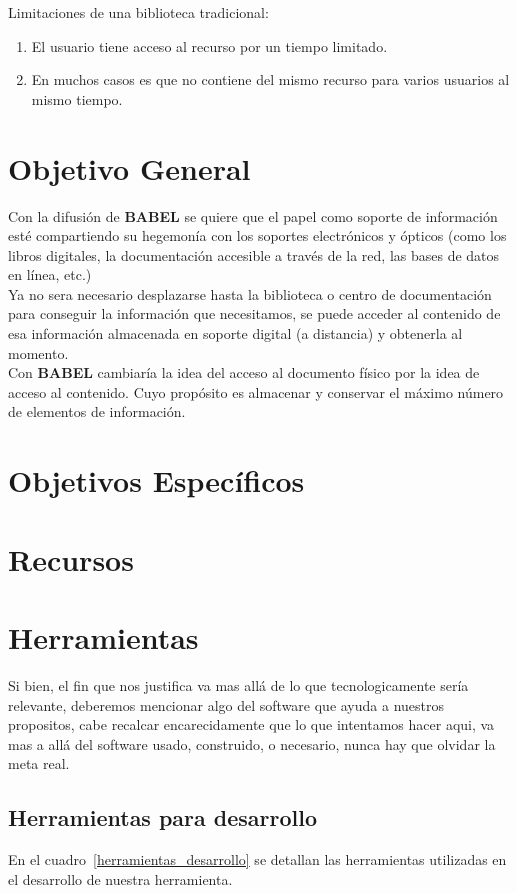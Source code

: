 \documentclass[letter,12pt]{article}
\begin{document}
Limitaciones de una biblioteca tradicional:

\begin{enumerate}
\item El usuario tiene acceso al recurso por un tiempo limitado.
\item En muchos casos es que no contiene del mismo recurso para varios usuarios al mismo tiempo.
\end{enumerate} 

\section{Objetivo General}
Con la difusión de {\bf BABEL} se quiere que el papel como soporte de información esté compartiendo su hegemonía con los
soportes electrónicos y ópticos (como los libros digitales, la documentación accesible a través de la red, las bases de
datos en línea, etc.)\\
Ya no sera necesario desplazarse hasta la biblioteca o centro de documentación para conseguir la información que
necesitamos, se puede acceder al contenido de esa información almacenada en soporte digital (a distancia) y obtenerla al
momento.\\
Con {\bf BABEL} cambiaría la idea del acceso al documento físico por la idea de acceso al contenido. Cuyo propósito es
almacenar y conservar el máximo número de elementos de información.
\section{Objetivos Específicos}

\section{Recursos}

\section{Herramientas}
Si bien, el fin que nos justifica va mas allá de lo que tecnologicamente sería relevante, deberemos mencionar algo del
software que ayuda a nuestros propositos, cabe recalcar encarecidamente que lo que intentamos hacer aqui, va mas a allá
del software usado, construido, o necesario, nunca hay que olvidar la meta real.

\subsection{Herramientas para desarrollo}
En el cuadro~\ref{herramientas_desarrollo} se detallan las herramientas utilizadas en el desarrollo de nuestra herramienta.
\end{document}
